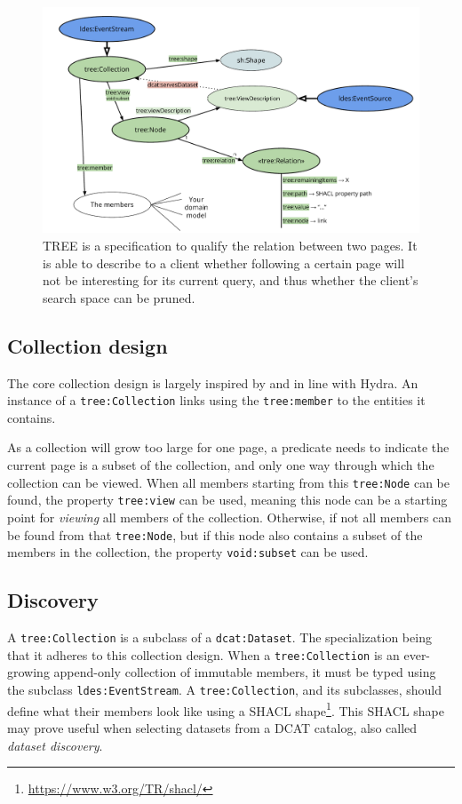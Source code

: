 \documentclass[
]{ceurart}
\begin{document}
\begin{figure}
  \centering
  \includegraphics[width=\linewidth]{overview}
  \caption{TREE is a specification to qualify the relation between two pages. It is able to describe to a client whether following a certain page will not be interesting for its current query, and thus whether the client’s search space can be pruned.}
  \label{treespec}
\end{figure}

\subsection{Collection design}

The core collection design is largely inspired by and in line with Hydra.
An instance of a \texttt{tree:Collection} links using the \texttt{tree:member} to the entities it contains.

As a collection will grow too large for one page, a predicate needs to indicate the current page is a subset of the collection, and only one way through which the collection can be viewed.
When all members starting from this \texttt{tree:Node} can be found, the property \texttt{tree:view} can be used, meaning this node can be a starting point for \textit{viewing} all members of the collection.
Otherwise, if not all members can be found from that \texttt{tree:Node}, but if this node also contains a subset of the members in the collection, the property \texttt{void:subset} can be used.

\subsection{Discovery}

A \texttt{tree:Collection} is a subclass of a \texttt{dcat:Dataset}.
The specialization being that it adheres to this collection design.
When a \texttt{tree:Collection} is an ever-growing append-only collection of immutable members, it must be typed using the subclass \texttt{ldes:EventStream}.
A \texttt{tree:Collection}, and its subclasses, should define what their members look like using a SHACL shape\footnote{\url{https://www.w3.org/TR/shacl/}}.
This SHACL shape may prove useful when selecting datasets from a DCAT catalog, also called \textit{dataset discovery}.
\end{document}
